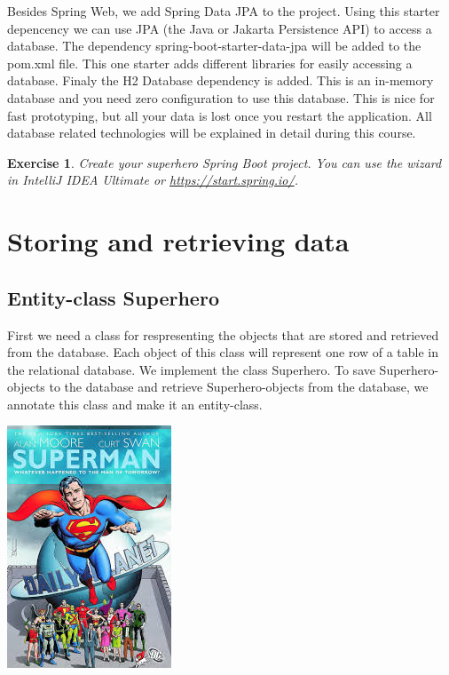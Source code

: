 \documentclass[a4paper, 12pt]{report}
\newenvironment{boxexercise}
{\begin{tcolorbox}
[enhanced jigsaw,breakable,pad at break*=1mm,
 colback=tsyellow!20,boxrule=0pt,frame hidden]}
{\end{tcolorbox}}
\newtheorem{envoefening}{\textbf{Exercise}}[chapter]
\newenvironment{oefening}
               {\begin{boxexercise}\begin{envoefening}}
               {\end{envoefening}\end{boxexercise}}
\begin{document}
Besides Spring Web, we add Spring Data JPA to the project. Using this starter depencency we can use JPA (the Java or Jakarta Persistence API) to access a database. 
The dependency spring-boot-starter-data-jpa will be added to the pom.xml file. This one starter adds different libraries for easily accessing a database.
Finaly the H2 Database dependency is added. This is an in-memory database 
and you need zero configuration to use this database. This is nice for fast prototyping, but all your data is lost once you restart the application. All database related technologies will be explained in detail during this course. 

\begin{oefening}
Create your superhero Spring Boot project. You can use the wizard in IntelliJ IDEA Ultimate or \url{https://start.spring.io/}.
\end{oefening}

\section{Storing and retrieving data}

\subsection{Entity-class Superhero}

First we need a class for respresenting the objects that are stored and retrieved from the database. Each object of this class will represent one row of a table in the relational database.
We implement the class Superhero. To save Superhero-objects to the database and retrieve Superhero-objects from the database, we annotate this class and make it an entity-class. 

\includegraphics[scale=0.5]{./images/chapter2/superman.jpeg} 
\end{document}
